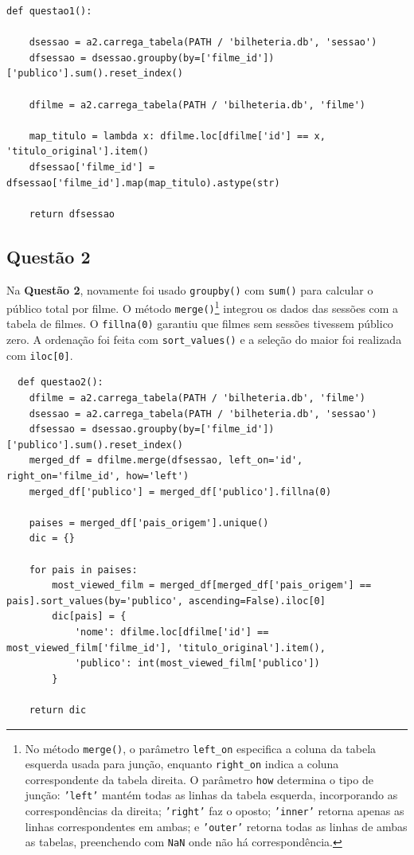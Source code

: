 \documentclass{article}
\begin{document}
\linespread{1}
\begin{lstlisting}
def questao1():
    
    dsessao = a2.carrega_tabela(PATH / 'bilheteria.db', 'sessao')
    dfsessao = dsessao.groupby(by=['filme_id'])['publico'].sum().reset_index()

    dfilme = a2.carrega_tabela(PATH / 'bilheteria.db', 'filme')
    
    map_titulo = lambda x: dfilme.loc[dfilme['id'] == x, 'titulo_original'].item()
    dfsessao['filme_id'] =  dfsessao['filme_id'].map(map_titulo).astype(str)
    
    return dfsessao
\end{lstlisting}
\linespread{1.5}
\subsection*{Questão 2}
Na \textbf{Questão 2}, novamente foi usado \texttt{groupby()} com \texttt{sum()} para calcular o público total por filme. O método \texttt{merge()}\footnote{No método \texttt{merge()}, o parâmetro \texttt{left\_on} especifica a coluna da tabela esquerda usada para junção, enquanto \texttt{right\_on} indica a coluna correspondente da tabela direita. O parâmetro \texttt{how} determina o tipo de junção: \texttt{'left'} mantém todas as linhas da tabela esquerda, incorporando as correspondências da direita; \texttt{'right'} faz o oposto; \texttt{'inner'} retorna apenas as linhas correspondentes em ambas; e \texttt{'outer'} retorna todas as linhas de ambas as tabelas, preenchendo com \texttt{NaN} onde não há correspondência.} integrou os dados das sessões com a tabela de filmes. O \texttt{fillna(0)} garantiu que filmes sem sessões tivessem público zero. A ordenação foi feita com \texttt{sort\_values()} e a seleção do maior foi realizada com \texttt{iloc[0]}.
\linespread{1}
\begin{lstlisting}
  def questao2():
    dfilme = a2.carrega_tabela(PATH / 'bilheteria.db', 'filme')
    dsessao = a2.carrega_tabela(PATH / 'bilheteria.db', 'sessao')
    dfsessao = dsessao.groupby(by=['filme_id'])['publico'].sum().reset_index()
    merged_df = dfilme.merge(dfsessao, left_on='id', right_on='filme_id', how='left')
    merged_df['publico'] = merged_df['publico'].fillna(0)
    
    paises = merged_df['pais_origem'].unique()
    dic = {}
    
    for pais in paises:
        most_viewed_film = merged_df[merged_df['pais_origem'] == pais].sort_values(by='publico', ascending=False).iloc[0]
        dic[pais] = {
            'nome': dfilme.loc[dfilme['id'] == most_viewed_film['filme_id'], 'titulo_original'].item(),
            'publico': int(most_viewed_film['publico'])
        }
    
    return dic
\end{lstlisting}
\end{document}
